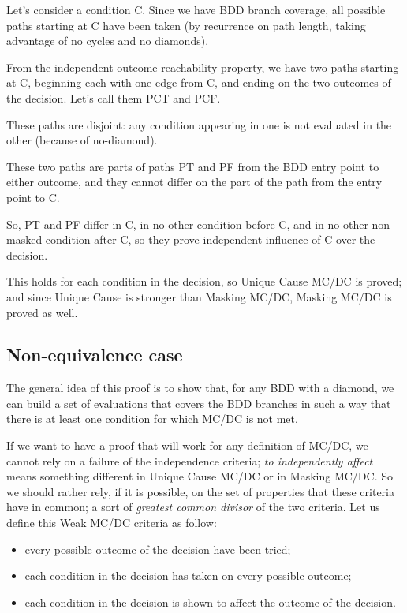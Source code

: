 \documentclass[a4paper,12pt,twoside]{article}
\begin{document}
Let's consider a condition C. Since we have BDD branch coverage,
all possible paths starting at C have been taken (by recurrence on path
length, taking advantage of no cycles and no diamonds).

From the independent outcome reachability property, we have two paths
starting at C, beginning each with one edge from C, and ending on the
two outcomes of the decision. Let's call them PCT and PCF.

These paths are disjoint: any condition appearing in one is not evaluated
in the other (because of no-diamond).

These two paths are parts of paths PT and PF from the BDD entry point to
either outcome, and they cannot differ on the part of the path from the
entry point to C.

So, PT and PF differ in C, in no other condition before C, and in no
other non-masked condition after C, so they prove independent influence
of C over the decision.

This holds for each condition in the decision, so Unique Cause MC/DC
is proved; and since Unique Cause is stronger than Masking MC/DC,
Masking MC/DC is proved as well.

\subsection{Non-equivalence case}

The general idea of this proof is to show that, for any BDD with a
diamond, we can build a set of evaluations that covers the BDD
branches in such a way that there is at least one condition for which
MC/DC is not met.

If we want to have a proof that will work for any definition of MC/DC,
we cannot rely on a failure of the independence criteria; \textit{to
independently affect} means something different in Unique Cause MC/DC
or in Masking MC/DC. So we should rather rely, if it is possible, on
the set of properties that these criteria have in common; a sort of
\textit{greatest common divisor} of the two criteria. Let us define
this Weak MC/DC criteria as follow:

\begin{itemize}
\item every possible outcome of the decision have been tried;
\item each condition in the decision has taken on every possible outcome;
\item each condition in the decision is shown to affect the outcome of the
      decision.
\end{itemize}
\end{document}
